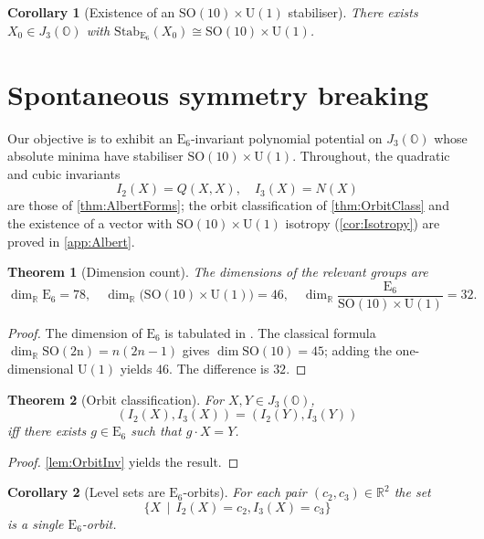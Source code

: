 \documentclass[pdflatex,sn-mathphys-num]{sn-jnl}
\theoremstyle{thmstyleone}
\newtheorem{theorem}{Theorem}
\newtheorem{corollary}[corollary]{Corollary}
\theoremstyle{thmstyletwo}%
\theoremstyle{thmstylethree}%
\newcommand{\SO}[1]{\mathrm{SO(#1)}}
\newcommand{\U}[1]{\mathrm{U(#1)}}
\newcommand{\E}[1]{\mathrm{E_{#1}}}
\newcommand{\SOTen}{\SO{10}}
\newcommand{\UOne}{\U{1}}
\newcommand{\ESix}{\E{6}}
\newcommand{\R}{\mathbb{R}}
\begin{document}
\begin{corollary}[Existence of an $\SOTen\times \UOne$ stabiliser]
\label{cor:Isotropy}
There exists \(X_{0}\in J_{3}(\mathbb{O})\) with
\(\mathrm{Stab}_{\ESix}(X_{0})\cong \SOTen\times \UOne\).
\end{corollary}

\section{Spontaneous symmetry breaking}
\label{sec:SSB}
Our objective is to exhibit an $\ESix$-invariant polynomial potential on
$J_{3}(\mathbb{O})$ whose absolute minima have stabiliser
$\SOTen\times \UOne$.  Throughout, the quadratic and cubic invariants
\[
  I_{2}(X)=Q(X,X),
  \quad
  I_{3}(X)=N(X)
\]
are those of \autoref{thm:AlbertForms}; the orbit classification
of \autoref{thm:OrbitClass} and the existence of a vector with
$\SOTen\times \UOne$ isotropy (\autoref{cor:Isotropy}) are proved in \ref{app:Albert}.

\begin{theorem}[Dimension count]
\label{thm:DimCount}
The dimensions of the relevant groups are
\[
  \dim_\R \ESix = 78,
  \quad
  \dim_\R\bigl(\SOTen\times \UOne\bigr) = 46,
  \quad
  \dim_\R\frac{\ESix}{\SOTen\times \UOne} = 32.
\]
\end{theorem}

\begin{proof}
The dimension of $\ESix$ is tabulated in \cite{Slansky:1981}.  The
classical formula \(\dim_\R \SO{2n}=n(2n-1)\) gives
\(\dim \SOTen=45\); adding the one-dimensional $\UOne$ yields $46$.  The
difference is $32$.
\end{proof}

\begin{theorem}[Orbit classification]\label{thm:OrbitClassBody}
For \(X,Y\in J_{3}(\mathbb{O})\),
\[
  (I_{2}(X),I_{3}(X))=(I_{2}(Y),I_{3}(Y))
\]
iff there exists $g\in\ESix$ such that $g\cdot X = Y$.
\end{theorem}

\begin{proof}
\autoref{lem:OrbitInv} yields the result.
\end{proof}

\begin{corollary}[Level sets are $\ESix$-orbits]\label{cor:LevelOrbit}
For each pair \((c_{2},c_{3})\in\mathbb R^{2}\) the set
\[\{X \,\mid\, I_{2}(X)=c_{2}, I_{3}(X)=c_{3}\}\]
is a single $\ESix$-orbit.
\end{corollary}
\end{document}
